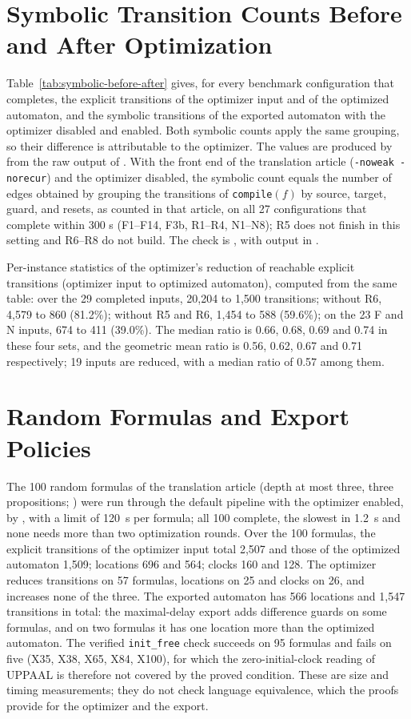 \documentclass{ieeeaccess}
\begin{document}
\section{Symbolic Transition Counts Before and After Optimization}
Table~\ref{tab:symbolic-before-after} gives, for every benchmark configuration that completes, the explicit
transitions of the optimizer input and of the optimized automaton, and the symbolic transitions of the
exported automaton with the optimizer disabled and enabled. Both symbolic counts apply the same grouping, so
their difference is attributable to the optimizer. The values are produced by
 from the raw output of . With the front end of the translation article (\texttt{-noweak -norecur}) and the optimizer disabled, the symbolic count equals the number of edges obtained by grouping the transitions of \texttt{compile}$(f)$ by source, target, guard, and resets, as counted in that article, on all 27 configurations that complete within 300 s (F1--F14, F3b, R1--R4, N1--N8); R5 does not finish in this setting and R6--R8 do not build. The check is , with output in .


Per-instance statistics of the optimizer's reduction of reachable explicit transitions (optimizer input to optimized automaton), computed from the same table: over the 29 completed inputs, 20,204 to 1,500 transitions; without R6, 4,579 to 860 (81.2\%); without R5 and R6, 1,454 to 588 (59.6\%); on the 23 F and N inputs, 674 to 411 (39.0\%). The median ratio is 0.66, 0.68, 0.69 and 0.74 in these four sets, and the geometric mean ratio is 0.56, 0.62, 0.67 and 0.71 respectively; 19 inputs are reduced, with a median ratio of 0.57 among them.

\section{Random Formulas and Export Policies}
The 100 random formulas of the translation article (depth at most three, three propositions; ) were run through the default pipeline with the optimizer enabled, by , with a limit of 120~s per formula; all 100 complete, the slowest in 1.2~s and none needs more than two optimization rounds. Over the 100 formulas, the explicit transitions of the optimizer input total 2,507 and those of the optimized automaton 1,509; locations 696 and 564; clocks 160 and 128. The optimizer reduces transitions on 57 formulas, locations on 25 and clocks on 26, and increases none of the three. The exported automaton has 566 locations and 1,547 transitions in total: the maximal-delay export adds difference guards on some formulas, and on two formulas it has one location more than the optimized automaton. The verified \texttt{init\_free} check succeeds on 95 formulas and fails on five (X35, X38, X65, X84, X100), for which the zero-initial-clock reading of UPPAAL is therefore not covered by the proved condition. These are size and timing measurements; they do not check language equivalence, which the proofs provide for the optimizer and the export.
\end{document}
